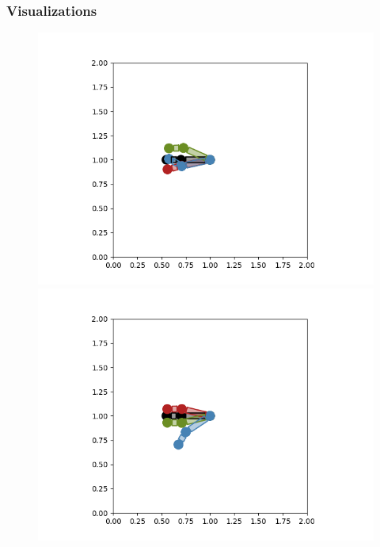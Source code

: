 \documentclass{article}
\begin{document}
\subsubsection{Visualizations}
\begin{figure}[htbp]
  \centering
  \begin{minipage}{0.45\textwidth}
    \includegraphics[width=\linewidth]{p1.2.ec100.png}
    \caption{}
  \end{minipage}\hfill
  \begin{minipage}{0.45\textwidth}
    \includegraphics[width=\linewidth]{p1.2.ec500.png}
    \caption{}
  \end{minipage}
  \begin{minipage}{0.45\textwidth}

\end{minipage}
\end{figure}
\end{document}
